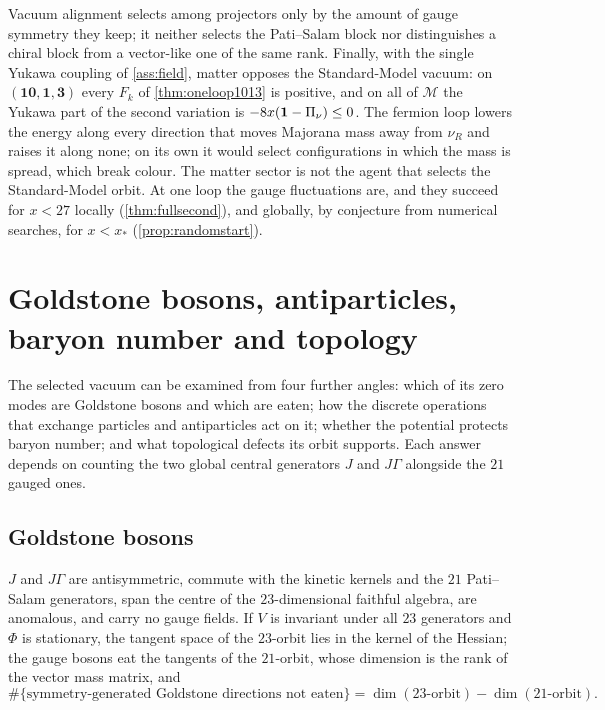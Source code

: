 Vacuum alignment \cite{Peskin80,Preskill81} selects among projectors only by the amount of gauge symmetry they keep; it neither selects the Pati--Salam block nor
distinguishes a chiral block from a vector-like one of the same rank. Finally, with the single Yukawa coupling of \cref{ass:field}, matter opposes the
Standard-Model vacuum: on $(\mathbf{10},\mathbf1,\mathbf3)$ every $F_k$
of \cref{thm:oneloop1013} is positive, and on all of $\mathcal M$ the Yukawa part of the second variation is $-8x(\mathbf 1-\Pi_\nu)\le0$. The fermion loop lowers the energy
along every direction that moves Majorana mass away from $\nu_R$ and raises it along none; on its own it would select configurations in which the mass is
spread, which break colour. The matter sector is not the agent that selects the Standard-Model orbit. At one loop the gauge fluctuations are, and they succeed
for $x<27$ locally (\cref{thm:fullsecond}), and globally, by conjecture from numerical searches, for $x<x_*$ (\cref{prop:randomstart}).



\section{Goldstone bosons, antiparticles, baryon number and topology}
\label{sec:goldstone}

The selected vacuum can be examined from four further angles: which of its zero modes are Goldstone bosons and which are eaten; how the discrete
operations that exchange particles and antiparticles act on it; whether the potential protects baryon number; and what topological defects its orbit
supports. Each answer depends on counting the two global central generators $J$ and $J\Gamma$ alongside the $21$ gauged ones.

\subsection{Goldstone bosons}

\begin{proposition}
\label{prop:global}
$J$ and $J\Gamma$ are antisymmetric, commute with the kinetic kernels and the $21$ Pati--Salam generators, span the centre of the $23$-dimensional faithful
algebra, are anomalous, and carry no gauge fields. If $V$ is invariant under all $23$ generators and $\Phi$ is stationary, the tangent space of the $23$-orbit
lies in the kernel of the Hessian; the gauge bosons eat the tangents of the $21$-orbit, whose dimension is the rank of the vector mass matrix, and
\[
\#\{\text{symmetry-generated Goldstone directions not eaten}\}=\dim(23\text{-orbit})-\dim(21\text{-orbit}).
\]
\end{proposition}

